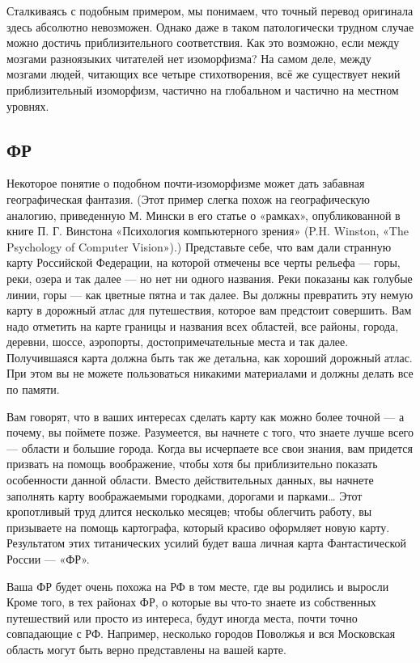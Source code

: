 \documentclass[../main.tex]{subfiles}
\begin{document}
Сталкиваясь с подобным примером, мы понимаем, что точный перевод оригинала здесь абсолютно невозможен. Однако даже в таком патологически трудном случае можно достичь приблизительного соответствия. Как это возможно, если между мозгами разноязыких читателей нет изоморфизма? На самом деле, между мозгами людей, читающих все четыре стихотворения, всё же существует некий приблизительный изоморфизм, частично на глобальном и частично на местном уровнях.


\subsection{ФР}

Некоторое понятие о подобном почти-изоморфизме может дать забавная географическая фантазия. (Этот пример слегка похож на географическую аналогию, приведенную М. Мински в его статье о «рамках», опубликованной в книге П. Г. Винстона «Психология компьютерного зрения» (P.H. Winston, «The Psychology of Computer Vision»).) Представьте себе, что вам дали странную карту Российской Федерации, на которой отмечены все черты рельефа --- горы, реки, озера и так далее --- но нет ни одного названия. Реки показаны как голубые линии, горы --- как цветные пятна и так далее. Вы должны превратить эту немую карту в дорожный атлас для путешествия, которое вам предстоит совершить. Вам надо отметить на карте границы и названия всех областей, все районы, города, деревни, шоссе, аэропорты, достопримечательные места и так далее. Получившаяся карта должна быть так же детальна, как хороший дорожный атлас. При этом вы не можете пользоваться никакими материалами и должны делать все по памяти.

Вам говорят, что в ваших интересах сделать карту как можно более точной --- а почему, вы поймете позже. Разумеется, вы начнете с того, что знаете лучше всего --- области и большие города. Когда вы исчерпаете все свои знания, вам придется призвать на помощь воображение, чтобы хотя бы приблизительно показать особенности данной области. Вместо действительных данных, вы начнете заполнять карту воображаемыми городками, дорогами и парками\ldots{} Этот кропотливый труд длится несколько месяцев; чтобы облегчить работу, вы призываете на помощь картографа, который красиво оформляет новую карту. Результатом этих титанических усилий будет ваша личная карта Фантастической России --- «ФР».

Ваша ФР будет очень похожа на РФ в том месте, где вы родились и выросли Кроме того, в тех районах ФР, о которые вы что-то знаете из собственных путешествий или просто из интереса, будут иногда места, почти точно совпадающие с РФ. Например, несколько городов Поволжья и вся Московская область могут быть верно представлены на вашей карте.
\end{document}

